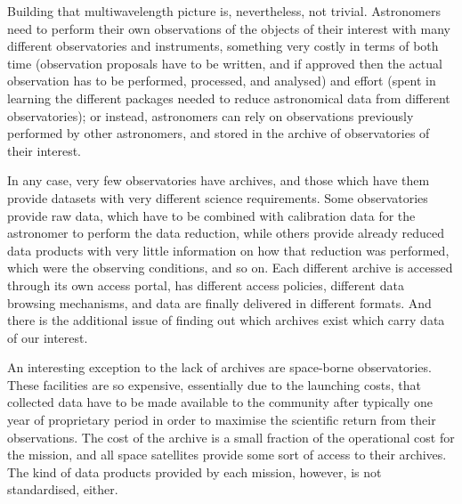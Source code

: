 	 Building that multiwavelength picture is, nevertheless, not
	trivial. Astronomers need to perform their own observations
	of the objects of their interest with many different
	observatories and instruments, something very costly in terms
	of both time (observation proposals have to be written, and if
	approved then the actual observation has to be performed,
	processed, and analysed) and effort (spent in learning the
	different packages needed to reduce astronomical data from
	different observatories); or instead, astronomers can rely on
	observations previously performed by other astronomers, and
	stored in the archive of observatories of their interest.
	
	 In any case, very few observatories have archives, and
	those which have them provide datasets with very different
	science requirements. Some observatories provide raw data,
	which have to be combined with calibration data for the
	astronomer to perform the data reduction, while others provide
	already reduced data products with very little information on
	how that reduction was performed, which were the observing
	conditions, and so on. Each different archive is accessed
	through its own access portal, has different access policies,
	different data browsing mechanisms, and data are finally
	delivered in different formats. And there is the additional
	issue of finding out which archives exist which carry data of
	our interest.
	
	 An interesting exception to the lack of archives are
	space-borne observatories. These facilities are so expensive,
	essentially due to the launching costs,
	that collected data have to be made available to the community
	after typically one year of proprietary period in order to
	maximise the scientific return from their observations. The
	cost of the archive is a small fraction of the operational cost
	for the mission, and all space satellites provide some sort of
	access to their archives. The kind of data products provided by
	each mission, however, is not standardised, either.

	

